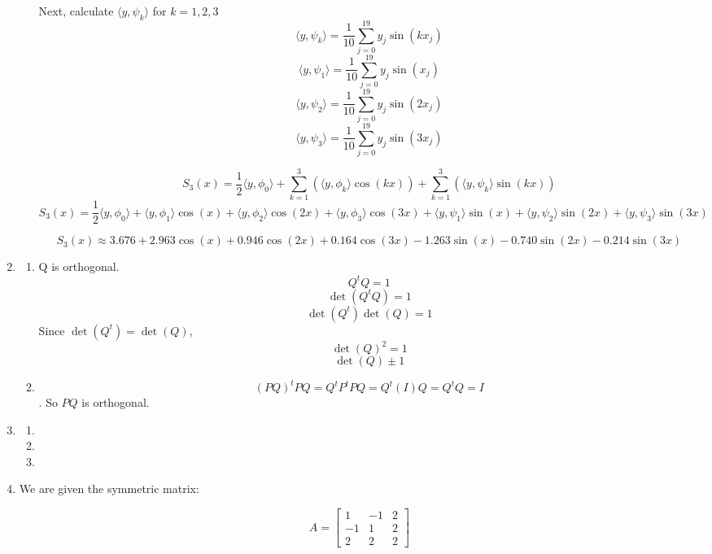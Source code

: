 \documentclass[12pt]{article}
\begin{document}
\begin{enumerate}[leftmargin=0em]
\begin{enumerate}[leftmargin=!]
        Next, calculate \(\langle y,\psi _{k}\rangle \) for \(k=1,2,3\)
        \[\langle y,\psi _{k}\rangle =\frac{1}{10}\sum _{j=0}^{19}y_{j}\sin (kx_{j})\]
        \[\langle y,\psi _{1}\rangle =\frac{1}{10}\sum _{j=0}^{19}y_{j}\sin (x_{j})\]
        \[\langle y,\psi _{2}\rangle =\frac{1}{10}\sum _{j=0}^{19}y_{j}\sin (2x_{j})\]
        \[\langle y,\psi _{3}\rangle =\frac{1}{10}\sum _{j=0}^{19}y_{j}\sin (3x_{j})\]

        \[S_{3}(x)=\frac{1}{2}\langle y,\phi _{0}\rangle +\sum _{k=1}^{3}(\langle y,\phi _{k}\rangle \cos (kx))+\sum _{k=1}^{3}(\langle y,\psi _{k}\rangle \sin (kx))\]
        \[S_{3}(x)=\frac{1}{2}\langle y,\phi _{0}\rangle +\langle y,\phi _{1}\rangle \cos (x)+\langle y,\phi _{2}\rangle \cos (2x)+\langle y,\phi _{3}\rangle \cos (3x)+\langle y,\psi _{1}\rangle \sin (x)+\langle y,\psi _{2}\rangle \sin (2x)+\langle y,\psi _{3}\rangle \sin (3x)\]
        
        \[S_{3}(x)\approx 3.676+2.963\cos (x)+0.946\cos (2x)+0.164\cos (3x)-1.263\sin (x)-0.740\sin (2x)-0.214\sin (3x)\]
        
    \end{enumerate} 

    \item
    \begin{enumerate}[leftmargin=!]
        \item Q is orthogonal.
        \[ Q^{t}Q=1\]
        \[\det(Q^tQ) = 1\]
        \[\det(Q^t)\det(Q)=1\]
        Since $\det(Q^t) = \det(Q)$,
        \[\det(Q)^2 = 1\]
        \[\det(Q)\pm 1\]
        \item
        \[(PQ)^tPQ = Q^tP^tPQ = Q^t(I)Q = Q^tQ=I\].
        So $PQ$ is orthogonal.
    \end{enumerate}

    \item
    \begin{enumerate}[leftmargin=!]
        \item 
        \item 
        \item 
    \end{enumerate}

    \item We are given the symmetric matrix:

    \[
    A = \begin{bmatrix}
    1 & -1 & 2 \\
    -1 & 1 & 2 \\
    2 & 2 & 2
    \end{bmatrix}
    \]
    

\end{enumerate}
\end{document}
